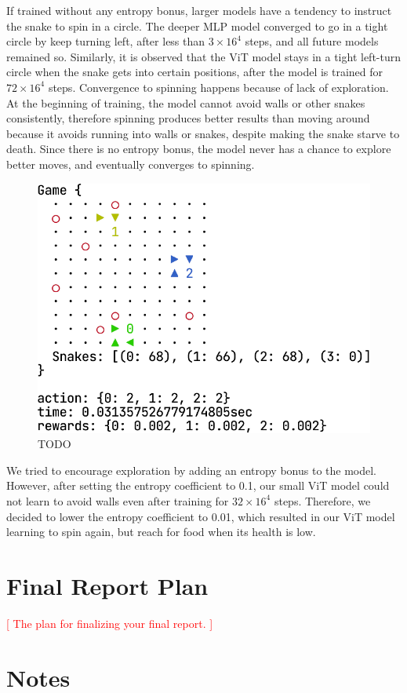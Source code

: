 \documentclass[a4paper]{article}
\newcommand{\todo}[1]{\textcolor{red}{[ #1 ]}}
\begin{document}

If trained without any entropy bonus,
larger models have a tendency to instruct the snake to spin in a circle.
The deeper MLP model converged to go in a tight circle by keep turning left,
after less than $3\times 16^4$ steps, and all future models remained so.
Similarly,
it is observed that the ViT model stays in a tight left-turn circle when the
snake gets into certain positions,
after the model is trained for $72\times 16^4$ steps.
Convergence to spinning happens because of lack of exploration.
At the beginning of training,
the model cannot avoid walls or other snakes consistently,
therefore spinning produces better results than moving around because it avoids
running into walls or snakes, despite making the snake starve to death.
Since there is no entropy bonus,
the model never has a chance to explore better moves,
and eventually converges to spinning.

\begin{figure}
    \centering
    \includegraphics[width=0.4\linewidth]{vit_spin_render.png}
    \caption{TODO
    }
    \label{fig:render}
\end{figure}

We tried to encourage exploration by adding an entropy bonus to the model.
However, after setting the entropy coefficient to 0.1,
our small ViT model could not learn to avoid walls even after training for
$32\times 16^4$ steps. Therefore,
we decided to lower the entropy coefficient to 0.01,
which resulted in our ViT model learning to spin again,
but reach for food when its health is low.

\section{Final Report Plan}

\todo{The plan for finalizing your final report.}

\section{Notes}
\end{document}
